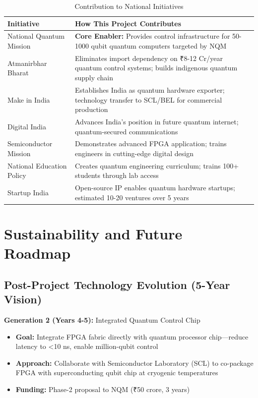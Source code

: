 \documentclass[12pt,a4paper]{article}
\begin{document}
\begin{enumerate}[leftmargin=*]
\begin{table}[H]
\centering
\caption{Contribution to National Initiatives}
\begin{tabular}{@{}lp{10cm}@{}}
\toprule
\textbf{Initiative} & \textbf{How This Project Contributes} \\
\midrule
National Quantum Mission & \textbf{Core Enabler:} Provides control infrastructure for 50-1000 qubit quantum computers targeted by NQM \\
\midrule
Atmanirbhar Bharat & Eliminates import dependency on ₹8-12 Cr/year quantum control systems; builds indigenous quantum supply chain \\
\midrule
Make in India & Establishes India as quantum hardware exporter; technology transfer to SCL/BEL for commercial production \\
\midrule
Digital India & Advances India's position in future quantum internet; quantum-secured communications \\
\midrule
Semiconductor Mission & Demonstrates advanced FPGA application; trains engineers in cutting-edge digital design \\
\midrule
National Education Policy & Creates quantum engineering curriculum; trains 100+ students through lab access \\
\midrule
Startup India & Open-source IP enables quantum hardware startups; estimated 10-20 ventures over 5 years \\
\bottomrule
\end{tabular}
\end{table}

\newpage

\section{Sustainability and Future Roadmap}

\subsection{Post-Project Technology Evolution (5-Year Vision)}

\textbf{Generation 2 (Years 4-5):} Integrated Quantum Control Chip
\begin{itemize}[leftmargin=*]
    \item \textbf{Goal:} Integrate FPGA fabric directly with quantum processor chip—reduce latency to <10 ns, enable million-qubit control
    \item \textbf{Approach:} Collaborate with Semiconductor Laboratory (SCL) to co-package FPGA with superconducting qubit chip at cryogenic temperatures
    \item \textbf{Funding:} Phase-2 proposal to NQM (₹50 crore, 3 years)
\end{itemize}


\end{enumerate}
\end{document}
